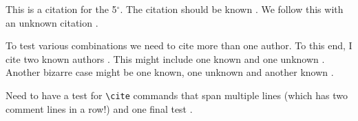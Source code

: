 \documentclass{article}
\newcommand{\deg}{\ensuremath{^\circ}} %
\begin{document}
This is a citation for the 5\deg. The citation should be known \cite{known}.
We follow this with an unknown citation \cite{unknown}.

To test various combinations we need to cite more than one author.  To this
end, I cite two known authors \cite{known,known2}.  This might include one
known and one unknown \cite{unknown,known}.  Another bizarre case might be
one known, one unknown and another known \cite{known,unknown,known2}.

Need to have a test for \verb#\cite# commands that span multiple lines \cite{
known,%
known2} (which has two comment lines in a row!) and one final test \cite{%
known, %
known2%
}.



\end{document}
